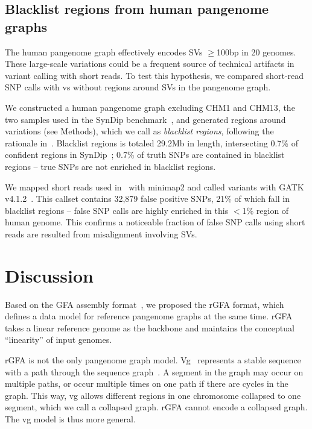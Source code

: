 \documentclass[twocolumn]{bmcart}%
\begin{document}
\subsection*{Blacklist regions from human pangenome graphs}

The human pangenome graph effectively encodes SVs $\ge$100bp
in 20 genomes. These large-scale variations could be a frequent source of
technical artifacts in variant calling with short reads. To test this
hypothesis, we compared short-read SNP calls with vs without regions around SVs
in the pangenome graph.

We constructed a human pangenome graph excluding CHM1 and CHM13, the two
samples used in the SynDip benchmark~\cite{Li:2018aa}, and generated regions
around variations (see Methods), which we call as \emph{blacklist regions},
following the rationale in~\cite{Amemiya:2019aa}.  Blacklist regions is totaled
29.2Mb in length, intersecting 0.7\% of confident regions in
SynDip~\cite{Li:2018aa}; 0.7\% of truth SNPs are contained in blacklist regions
-- true SNPs are not enriched in blacklist regions.

We mapped short reads used in~\cite{Li:2018aa} with minimap2 and called
variants with GATK v4.1.2~\cite{Depristo:2011vn}. This callset
contains 32,879 false positive SNPs, 21\% of which fall in blacklist regions --
false SNP calls are highly enriched in this $<$1\% region of human genome. This
confirms a noticeable fraction of false SNP calls using short reads are
resulted from misalignment involving SVs.

\section*{Discussion}

Based on the GFA assembly format~\cite{Li:2016aa}, we proposed the rGFA format,
which defines a data model for reference pangenome graphs at the same time.
rGFA takes a linear reference genome as the backbone and maintains the
conceptual ``linearity'' of input genomes.

rGFA is not the only pangenome graph model. Vg~\cite{Garrison:2018aa}
represents a stable sequence with a path through the sequence graph~\cite{10.12688/f1000research.19630.1}. A segment
in the graph may occur on multiple paths, or occur multiple times on one path
if there are cycles in the graph. This way, vg allows different regions in one
chromosome collapsed to one segment, which we call a collapsed graph. rGFA
cannot encode a collapsed graph. The vg model is thus more general.
\end{document}
